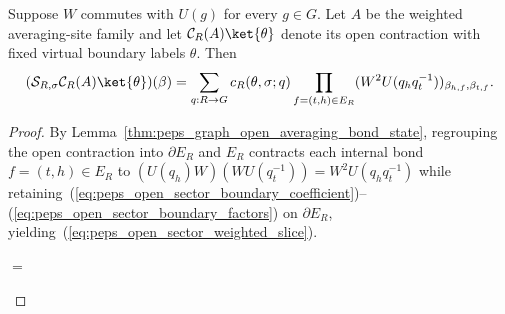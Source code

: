 \begin{lemma}%
    \label{thm:peps_open_sector_weighted_slice}
    \leanok
    Suppose $W$ commutes with $U(g)$ for every $g\in G$.
    Let $A$ be the weighted averaging-site family and let
    $\mathcal C_R(A)\ket{\theta}$ denote its open contraction
    with fixed virtual boundary labels $\theta$. Then
    \begin{align}
        (\mathcal S_{R,\sigma}\mathcal C_R(A)\ket{\theta})(\beta)
        =\sum_{q:R\to G}c_R(\theta,\sigma;q)
        \prod_{f=(t,h)\in E_R}
        (W^2U(q_hq_t^{-1}))_{\beta_{h,f},\beta_{t,f}}.
        \label{eq:peps_open_sector_weighted_slice}
    \end{align}
\end{lemma}
\begin{proof}\leanok
    By Lemma~\ref{thm:peps_graph_open_averaging_bond_state}, regrouping the
    open contraction into $\partial E_R$ and $E_R$ contracts each internal bond
    $f=(t,h)\in E_R$ to $(U(q_h)W)(WU(q_t^{-1}))=W^2U(q_hq_t^{-1})$ while
    retaining~(\ref{eq:peps_open_sector_boundary_coefficient})--(\ref{eq:peps_open_sector_boundary_factors})
    on $\partial E_R$, yielding~(\ref{eq:peps_open_sector_weighted_slice}).
    \begin{tenkzequation}
        \tenkzkernel
        \begin{tenkz}[rows={wire}, cols=3, bonds=none]
        \end{tenkz}
        $=$
        \begin{tenkz}[rows={wire}, cols=1, bonds=none]
        \end{tenkz}
    \end{tenkzequation}
\end{proof}

